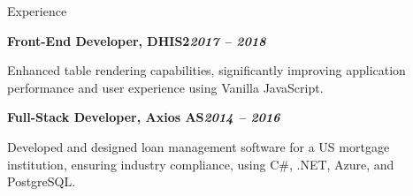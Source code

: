 \begin{rubric}{Experience}
\begin{compactitem}
\vspace{-12pt}
\end{compactitem}
%
\entry*[]%
\textbf{Front-End Developer, DHIS2\hfill\textit{2017 -- 2018}} \par
\begin{compactitem}
\item Enhanced table rendering capabilities, significantly improving application performance and user experience using Vanilla JavaScript.
\vspace{-12pt}
\end{compactitem}
%
\entry*[]%
\textbf{Full-Stack Developer, Axios AS\hfill\textit{2014 -- 2016}} \par
\begin{compactitem}
\item Developed and designed loan management software for a US mortgage institution, ensuring industry compliance, using C\#, .NET, Azure, and PostgreSQL.
\vspace{-12pt}
\end{compactitem}
%
\end{rubric}